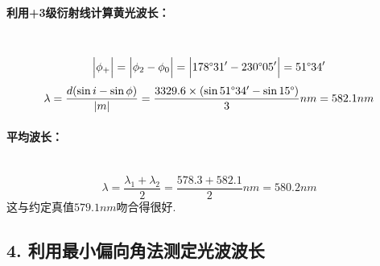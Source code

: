 \documentclass[UTF8]{ctexart}
\begin{document}
\paragraph{利用+3级衍射线计算黄光波长：}\quad\\
\[\Big{|}\phi_+\Big{|}=\Big{|}\phi_2-\phi_0\Big{|}=\Big{|}178\degree31'-230\degree05'\Big{|}=51\degree34'\]
\[\lambda=\frac{d(\sin i- \sin \phi)}{|m|}=\frac{3329.6\times(\sin51\degree34'-\sin15\degree)}{3}nm=582.1nm\]

\paragraph{平均波长：}\quad\\
\[\lambda=\frac{\lambda_1+\lambda_2}{2}=\frac{578.3+582.1}{2}nm=580.2nm\]
这与约定真值$579.1nm$吻合得很好.

\subsection*{ 4. 利用最小偏向角法测定光波波长}
\end{document}
